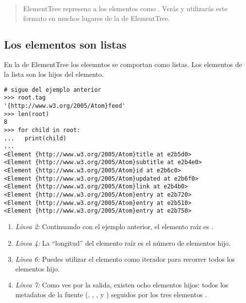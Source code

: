 \begin{quote}
ElementTree represena a los elementos  como . Verás y utilizarás este formato en muchos lugares de la  de ElementTree.
\end{quote}

\subsection{Los elementos son listas}

En la  de ElementTree los eleemntos se comportan como listas. Los elementos de la lista son los hijos del elemento.

\noindent\begin{minipage}{\textwidth}
\begin{lstlisting}[mathescape=True]
# sigue del ejemplo anterior
>>> root.tag
'{http://www.w3.org/2005/Atom}feed'
>>> len(root)
8
>>> for child in root:
...   print(child)
... 
<Element {http://www.w3.org/2005/Atom}title at e2b5d0>
<Element {http://www.w3.org/2005/Atom}subtitle at e2b4e0>
<Element {http://www.w3.org/2005/Atom}id at e2b6c0>
<Element {http://www.w3.org/2005/Atom}updated at e2b6f0>
<Element {http://www.w3.org/2005/Atom}link at e2b4b0>
<Element {http://www.w3.org/2005/Atom}entry at e2b720>
<Element {http://www.w3.org/2005/Atom}entry at e2b510>
<Element {http://www.w3.org/2005/Atom}entry at e2b750>
\end{lstlisting}
\end{minipage}

\begin{enumerate}

\item \emph{Línea 2:} Continuando con el ejemplo anterior, el elemento raíz es .

\item \emph{Línea 4:} La ``longitud'' del elemento raíz es el número de elementos hijo.

\item \emph{Línea 6:} Puedes utilizar el elemento como iterador para recorrer todos los elementos hijo.

\item \emph{Línea 7:} Como ves por la salida, existen ocho elementos hijos: todos los metadatos de la fuente (. , ,  y ) seguidos por los tres elementos .

\end{enumerate}

